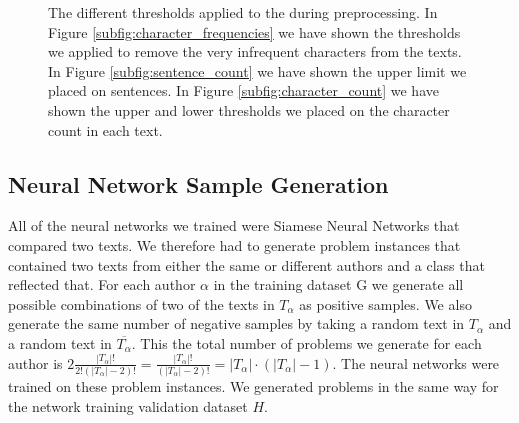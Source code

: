 \begin{figure}[htb]
\begin{minipage}{.5\linewidth}
{        }
    \end{minipage}\par\medskip
    \centering

    \caption{The different thresholds applied to the during preprocessing. In
        Figure \ref{subfig:character_frequencies} we have shown the thresholds
        we applied to remove the very infrequent characters from the texts. In
        Figure \ref{subfig:sentence_count} we have shown the upper limit we
        placed on sentences. In Figure \ref{subfig:character_count} we have
        shown the upper and lower thresholds we placed on the character count in
        each text.
    }
    \label{fig:cutoff_thresholds}
\end{figure}


\subsection{Neural Network Sample Generation} \label{subsec:problem_generation}

All of the neural networks we trained were Siamese Neural Networks that
compared two texts. We therefore had to generate problem instances that
contained two texts from either the same or different authors and a class
that reflected that. For each author $\alpha$ in the training dataset \gls{G}
we generate all possible combinations of two of the texts in $T_\alpha$ as
positive samples. We also generate the same number of negative samples by
taking a random text in $T_\alpha$ and a random text in $\overline{T_\alpha}$.
This the total number of problems we generate for each
author is $2\frac{\left|T_\alpha\right|!}{2!(\left|T_\alpha\right|-2)!}
= \frac{\left|T_\alpha\right|!}{(\left|T_\alpha\right|-2)!} =
\left|T_\alpha\right| \cdot (\left|T_\alpha\right| - 1) $. The neural
networks were trained on these problem instances. We generated problems in the
same way for the network training validation dataset $H$.
